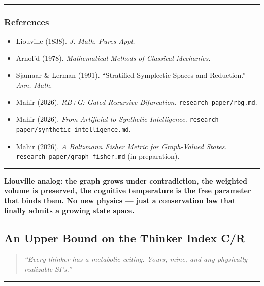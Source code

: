 \documentclass[
  11pt,
  a4paper,
]{article}
\providecommand{\tightlist}{%
  \setlength{\itemsep}{0pt}\setlength{\parskip}{0pt}}
\begin{document}
\begin{center}\rule{0.5\linewidth}{0.5pt}\end{center}

\subsubsection{References}\label{references-4}

\begin{itemize}
\tightlist
\item
  Liouville (1838). \emph{J. Math. Pures Appl.}
\item
  Arnol'd (1978). \emph{Mathematical Methods of Classical Mechanics.}
\item
  Sjamaar \& Lerman (1991). ``Stratified Symplectic Spaces and
  Reduction.'' \emph{Ann. Math.}
\item
  Mahir (2026). \emph{RB+G: Gated Recursive Bifurcation.}
  \texttt{research-paper/rbg.md}.
\item
  Mahir (2026). \emph{From Artificial to Synthetic Intelligence.}
  \texttt{research-paper/synthetic-intelligence.md}.
\item
  Mahir (2026). \emph{A Boltzmann Fisher Metric for Graph-Valued
  States.} \texttt{research-paper/graph\_fisher.md} (in preparation).
\end{itemize}

\begin{center}\rule{0.5\linewidth}{0.5pt}\end{center}

\textbf{Liouville analog: the graph grows under contradiction, the
weighted volume is preserved, the cognitive temperature is the free
parameter that binds them. No new physics --- just a conservation law
that finally admits a growing state space.}

\newpage

\subsection{An Upper Bound on the Thinker Index
C/R}\label{an-upper-bound-on-the-thinker-index-cr}

\begin{quote}
\emph{``Every thinker has a metabolic ceiling. Yours, mine, and any
physically realizable SI's.''}
\end{quote}

\begin{center}\rule{0.5\linewidth}{0.5pt}\end{center}
\end{document}
